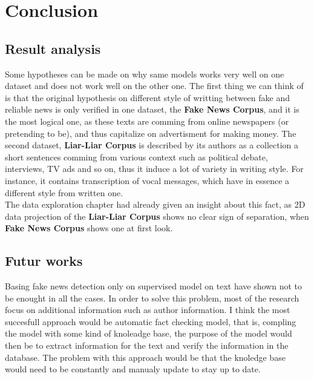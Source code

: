 \chapter{Conclusion}
\section{Result analysis}
Some hypotheses can be made on why same models works very well on one dataset and does not work well on the other one. The first thing we can think of is that the original hypothesis on different style of writting between fake and reliable news is only verified in one dataset, the \textbf{Fake News Corpus}, and it is the most logical one, as these texts are comming from online newspapers (or pretending to be), and thus capitalize on advertisment for making money. The second dataset, \textbf{Liar-Liar Corpus} is described by its authors as a collection a short sentences comming from various context such as political debate, interviews, TV ads and so on, thus it induce a lot of variety in writing style. For instance, it contains transcription of vocal messages, which have in essence a different style from written one. \\

The data exploration chapter had already given an insight about this fact, as 2D data projection of the \textbf{Liar-Liar Corpus} shows no clear sign of separation, when \textbf{Fake News Corpus} shows one at first look. 

\section{Futur works}
Basing fake news detection only on supervised model on text have shown not to be enought in all the cases. In order to solve this problem, most of the research focus on additional information such as author information. I think the most succesfull approach would be automatic fact checking model, that is, compling the model with some kind of knoleadge base, the purpose of the model would then be to extract information for the text and verify the information in the database. The problem with this approach would be that the knoledge base would need to be constantly and manualy update to stay up to date.